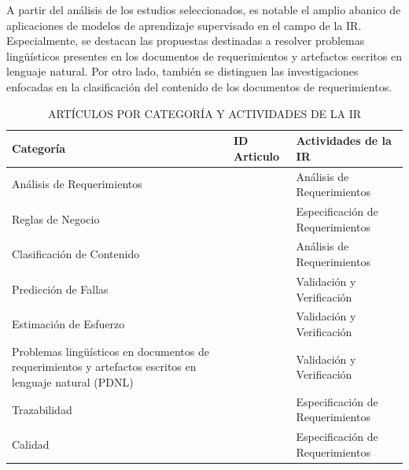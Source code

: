 \documentclass[journal]{IEEEtran}
\begin{document}
A partir del análisis de los estudios seleccionados, es notable el amplio abanico de aplicaciones de modelos de aprendizaje supervisado en el campo de la IR. Especialmente, se destacan las propuestas destinadas a resolver problemas lingüísticos presentes en los documentos de requerimientos y artefactos escritos en lenguaje natural. Por otro lado, también se distinguen las investigaciones enfocadas en la clasificación del contenido de los documentos de requerimientos.


\begin{table}[!t]
\renewcommand{\arraystretch}{1.3}
\caption{ARTÍCULOS POR CATEGORÍA Y ACTIVIDADES DE LA IR}
\label{tabla3}
\centering
\begin{tabular}{p{2.8cm}p{1.7cm}p{3cm}}
\hline
\hline
Categoría & ID Articulo & Actividades de la IR \\
\hline
Análisis de Requerimientos & \cite{Wang2016} & Análisis de Requerimientos \\ \cline{1-3}
Reglas de Negocio & \cite{sharma2014automated} & Especificación de Requerimientos \\ \cline{1-3}
Clasificación de Contenido & \cite{li2017identifying,Jindal20162027,kurtanovic2017automatically,dekhtyar2017re,abad2017works,Slankas2013,Slankas2013a,Merten2016,winkler2016automatic} & Análisis de Requerimientos \\ \cline{1-3}
Predicción de Fallas & \cite{del2017stability,dargan2016systems,fitzgerald2012early,malhotra2017exploratory,del2011requirement} & Validación y Verificación \\ \cline{1-3}
Estimación de Esfuerzo & \cite{Abdukalykov2011158} & Validación y Verificación\\ \cline{1-3}
Problemas lingüísticos en documentos de requerimientos y
artefactos escritos en lenguaje natural (PDNL) &\cite{yang2010extending,yang2012speculative,Knauss201685,Yang2011,Ott2013,nikora2009automated} & Validación y Verificación \\ \cline{1-3}
Trazabilidad &\cite{Li201725,Cleland-Huang2010,gokyer2008non,Mills2017,Sardinha2013,AtasM.2018} & Especificación de Requerimientos  \\ \cline{1-3}
Calidad & \cite{Parra2015180,Hayes2015,Hussain2007} & Especificación de Requerimientos \\
\hline \hline                                                                                                    
\end{tabular}
\end{table}
\end{document}
